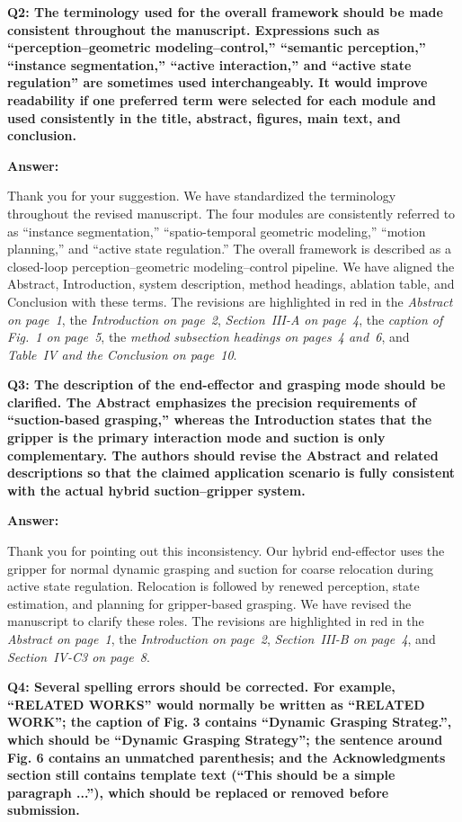 \documentclass[journal,10pt]{IEEEtran}
\newcommand{\question}[2]{%
  \par\smallskip\noindent
  {\color{responseblue}\bfseries\clubpenalty=10000\widowpenalty=10000 Q#1: #2\par}%
  \par\nobreak\noindent
}
\newcommand{\answer}{%
  \par\smallskip\noindent
  \textbf{Answer: }\ignorespaces
}
\begin{document}
\question{2}{The terminology used for the overall framework should be made consistent throughout the manuscript. Expressions such as “perception–geometric modeling–control,” “semantic perception,” “instance segmentation,” “active interaction,” and “active state regulation” are sometimes used interchangeably. It would improve readability if one preferred term were selected for each module and used consistently in the title, abstract, figures, main text, and conclusion.}

\answer
Thank you for your suggestion. We have standardized the terminology throughout the revised manuscript. The four modules are consistently referred to as ``instance segmentation,'' ``spatio-temporal geometric modeling,'' ``motion planning,'' and ``active state regulation.'' The overall framework is described as a closed-loop perception--geometric modeling--control pipeline. We have aligned the Abstract, Introduction, system description, method headings, ablation table, and Conclusion with these terms. The revisions are highlighted in red in the \textit{Abstract on page~1}, the \textit{Introduction on page~2}, \textit{Section~III-A on page~4}, the \textit{caption of Fig.~1 on page~5}, the \textit{method subsection headings on pages~4 and~6}, and \textit{Table~IV and the Conclusion on page~10}.

\question{3}{The description of the end-effector and grasping mode should be clarified. The Abstract emphasizes the precision requirements of “suction-based grasping,” whereas the Introduction states that the gripper is the primary interaction mode and suction is only complementary. The authors should revise the Abstract and related descriptions so that the claimed application scenario is fully consistent with the actual hybrid suction–gripper system.}

\answer
Thank you for pointing out this inconsistency. Our hybrid end-effector uses the gripper for normal dynamic grasping and suction for coarse relocation during active state regulation. Relocation is followed by renewed perception, state estimation, and planning for gripper-based grasping. We have revised the manuscript to clarify these roles. The revisions are highlighted in red in the \textit{Abstract on page~1}, the \textit{Introduction on page~2}, \textit{Section~III-B on page~4}, and \textit{Section~IV-C3 on page~8}.

\question{4}{Several spelling errors should be corrected. For example, “RELATED WORKS” would normally be written as “RELATED WORK”; the caption of Fig. 3 contains “Dynamic Grasping Strateg.”, which should be “Dynamic Grasping Strategy”; the sentence around Fig. 6 contains an unmatched parenthesis; and the Acknowledgments section still contains template text (“This should be a simple paragraph ...”), which should be replaced or removed before submission.}
\end{document}
